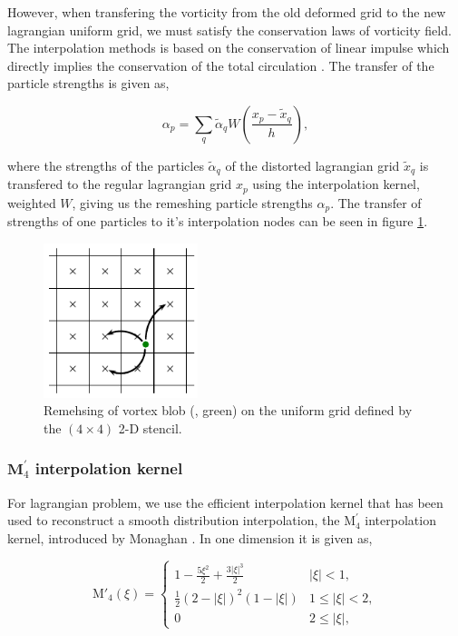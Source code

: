 However, when transfering the vorticity from the old deformed grid to the new lagrangian uniform grid, we must satisfy the conservation laws of vorticity field. The interpolation methods is based on the conservation of linear impulse which directly implies the conservation of the total circulation \cite{Cottet2000a}. The transfer of the particle strengths is given as, 

	\begin{equation}
	\alpha_p = \sum_q\tilde{\alpha}_q W \left(\frac{x_p - \tilde{x}_q}{h}\right),	
	\end{equation}

where the strengths of the particles $\tilde{\alpha}_q$ of the distorted lagrangian grid $\tilde{x}_q$ is transfered to the regular lagrangian grid $x_p$ using the interpolation kernel, weighted $W$, giving us the remeshing particle strengths $\alpha_p$. The transfer of strengths of one particles to it's interpolation nodes can be seen in figure \ref{fig:interpolationGrid}.


	\begin{figure}[t]
	\centering
	\includegraphics[width=0.4\textwidth]{figures/lagrangian/interpolationGrid.pdf}
	\caption{Remehsing of vortex blob ({\color{plotGreen}{$\bullet$}}, green) on the uniform grid defined by the $\left(4\times4\right)$ 2-D stencil.}
	\label{fig:interpolationGrid}
	\end{figure}

\subsubsection*{$\mathbf{M}^\prime_4$ interpolation kernel}
For lagrangian problem, we use the efficient interpolation kernel that has been used to reconstruct a smooth distribution interpolation, the $\mathrm{M}^{\prime}_4$ interpolation kernel, introduced by Monaghan \cite{Monaghan1985}. In one dimension it is given as,

	\begin{equation}
	{\mathrm{M'}_4}\left( {\xi} \right) =
	  \begin{cases}
	   {1 - \frac{{5{\xi ^2}}}{2} + \frac{{3{{\left| \xi  \right|}^3}}}{2}} & {\left| \xi \right|} < 1, \\
	   \frac{1}{2}{\left( {2 - \left| \xi  \right|} \right)^2}\left( {1 - \left| \xi  \right|} \right) & 1 \le {\left| \xi \right|} < 2,\\
	   0 & 2 \le \left| \xi \right|,
	  \end{cases}
	\label{eq:interpKernel}
	\end{equation}

